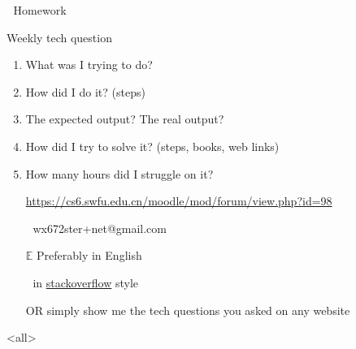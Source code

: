 \begin{frame}{{  \enspace}Homework}
  \begin{block}{Weekly tech question}
    \begin{enumerate}
    \item What was I trying to do?
    \item How did I do it? (steps)
    \item The expected output? The real output?
    \item How did I try to solve it? (steps, books, web links)
    \item How many hours did I struggle on it?
    \end{enumerate}
  \end{block}
  \begin{itemize}
  \item[\moodle] \url{https://cs6.swfu.edu.cn/moodle/mod/forum/view.php?id=98}
  \item[] \alert{\ttfamily wx672ster+net@gmail.com}
  \item[$\mathbb{E}$] Preferably in English
  \item[] in
    \href{https://stackoverflow.com/questions/39199299/what-is-the-essential-difference-between-compound-command-and-normal-command-inlink}{stackoverflow}
    style
  \item[OR] simply show me the tech questions you asked on any website
  \end{itemize}  
\end{frame}

\mode<all>
